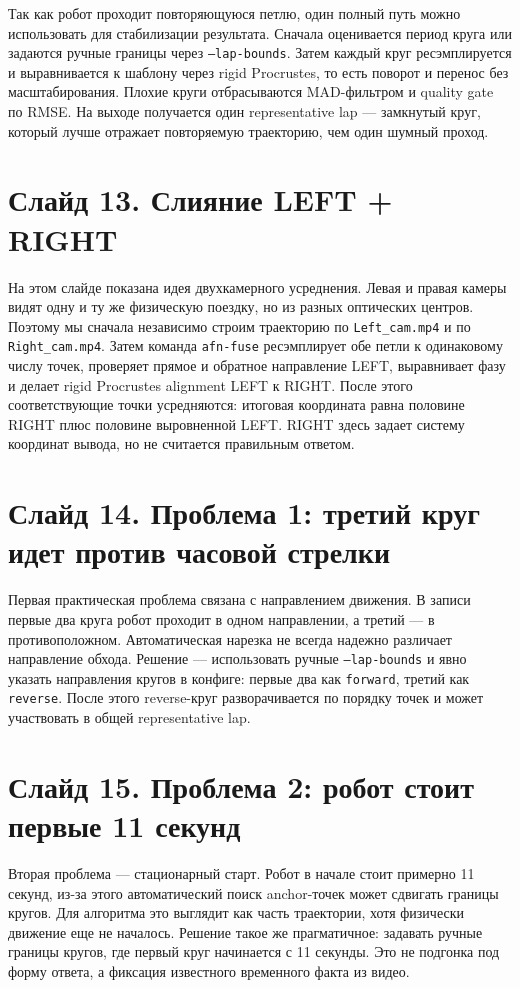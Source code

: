 \documentclass[12pt,a4paper]{article}
\newcommand{\code}[1]{\texttt{#1}}
\begin{document}
Так как робот проходит повторяющуюся петлю, один полный путь можно использовать для стабилизации результата. Сначала оценивается период круга или задаются ручные границы через \code{--lap-bounds}. Затем каждый круг ресэмплируется и выравнивается к шаблону через rigid Procrustes, то есть поворот и перенос без масштабирования. Плохие круги отбрасываются MAD-фильтром и quality gate по RMSE. На выходе получается один representative lap --- замкнутый круг, который лучше отражает повторяемую траекторию, чем один шумный проход.

\section*{Слайд 13. Слияние LEFT + RIGHT}

На этом слайде показана идея двухкамерного усреднения. Левая и правая камеры видят одну и ту же физическую поездку, но из разных оптических центров. Поэтому мы сначала независимо строим траекторию по \code{Left\_cam.mp4} и по \code{Right\_cam.mp4}. Затем команда \code{afn-fuse} ресэмплирует обе петли к одинаковому числу точек, проверяет прямое и обратное направление LEFT, выравнивает фазу и делает rigid Procrustes alignment LEFT к RIGHT. После этого соответствующие точки усредняются: итоговая координата равна половине RIGHT плюс половине выровненной LEFT. RIGHT здесь задает систему координат вывода, но не считается правильным ответом.

\section*{Слайд 14. Проблема 1: третий круг идет против часовой стрелки}

Первая практическая проблема связана с направлением движения. В записи первые два круга робот проходит в одном направлении, а третий --- в противоположном. Автоматическая нарезка не всегда надежно различает направление обхода. Решение --- использовать ручные \code{--lap-bounds} и явно указать направления кругов в конфиге: первые два как \code{forward}, третий как \code{reverse}. После этого reverse-круг разворачивается по порядку точек и может участвовать в общей representative lap.

\section*{Слайд 15. Проблема 2: робот стоит первые 11 секунд}

Вторая проблема --- стационарный старт. Робот в начале стоит примерно 11 секунд, из-за этого автоматический поиск anchor-точек может сдвигать границы кругов. Для алгоритма это выглядит как часть траектории, хотя физически движение еще не началось. Решение такое же прагматичное: задавать ручные границы кругов, где первый круг начинается с 11 секунды. Это не подгонка под форму ответа, а фиксация известного временного факта из видео.
\end{document}
